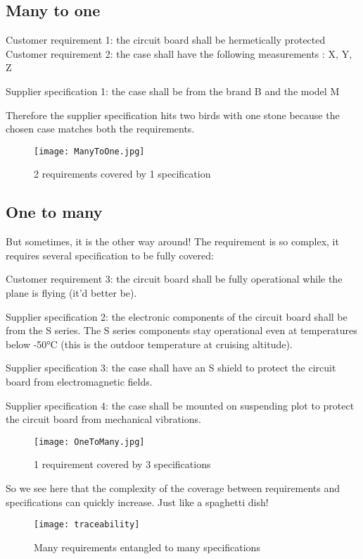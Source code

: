 \subsection{Many to one}
Customer requirement 1: the circuit board shall be hermetically protected\\
Customer requirement 2: the case shall have the following measurements : X, Y, Z

Supplier specification 1: the case shall be from the brand B and the model M

Therefore the supplier specification hits two birds with one stone because the chosen case matches both the requirements.

\begin{figure}[h]
    \centering
    \texttt{[image: ManyToOne.jpg]}
    \caption{2 requirements covered by 1 specification}
    \label{fig:ManyToOne}
\end{figure}

\subsection{One to many}
But sometimes, it is the other way around! The requirement is so complex, it requires several specification to be fully covered:

Customer requirement 3: the circuit board shall be fully operational while the plane is flying (it’d better be).

Supplier specification 2: the electronic components of the circuit board shall be from the S series. The S series components stay operational even at temperatures below -50°C (this is the outdoor temperature at cruising altitude).

Supplier specification 3: the case shall have an S shield to protect the circuit board from electromagnetic fields.

Supplier specification 4: the case shall be mounted on suspending plot to protect the circuit board from mechanical vibrations.
\begin{figure}[h]
    \centering
    \texttt{[image: OneToMany.jpg]}
    \caption{1 requirement covered by 3 specifications}
    \label{fig:OneToMany}
\end{figure}

So we see here that the complexity of the coverage between requirements and specifications can quickly increase. Just like a spaghetti dish!

\begin{figure}[h]
    \centering
    \texttt{[image: traceability]}
    \caption{Many requirements entangled to many specifications}
    \label{fig:WholeTraceability}
\end{figure}

